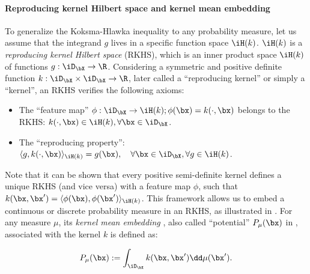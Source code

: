 \paragraph{Reproducing kernel Hilbert space and kernel mean embedding}
To generalize the Koksma-Hlawka inequality to any probability measure, let us assume that the integrand $g$ lives in a specific function space $\iH(k)$. $\iH(k)$ is a \emph{reproducing kernel Hilbert space} (RKHS), which is an inner product space $\iH(k)$ of functions $g:\iD_{\bX} \rightarrow \R$. 
Considering a symmetric and positive definite function $k: \iD_{\bX} \times \iD_{\bX} \rightarrow \R$, later called a ``reproducing kernel'' or simply a ``kernel'', an RKHS verifies the following axioms: 
\begin{itemize}
    \item The ``feature map'' $\phi : \iD_{\bX} \to \iH(k); \phi(\bx) = k(\cdot, \bx)$ belongs to the RKHS: $k(\cdot, \bx) \in \iH(k), \forall \bx \in \iD_{\bX}$.
    \item The ``reproducing property'': $\langle g, k(\cdot, \bx) \rangle_{\iH(k)} = g(\bx), \quad \forall \bx \in \iD_{\bX}, \forall g \in \iH(k)$.
\end{itemize}
Note that it can be shown that every positive semi-definite kernel defines a unique RKHS (and vice versa) with a feature map $\phi$, such that $k(\bx, \bx') = \langle \phi(\bx), \phi(\bx') \rangle_{\iH(k)}$.
This framework allows us to embed a continuous or discrete probability measure in an RKHS, as illustrated in . 
For any measure $\mu$, its \emph{kernel mean embedding} \citep{sejdinovic_2013}, also called ``potential'' $P_{\mu}(\bx)$ in \cite{pronzato_zhigljavsky_2020}, associated with the kernel $k$ is defined as:

\begin{equation}
   P_{\mu}(\bx) := \int_{\iD_{\bX}} k(\bx, \bx') \dd \mu(\bx').
\end{equation}

